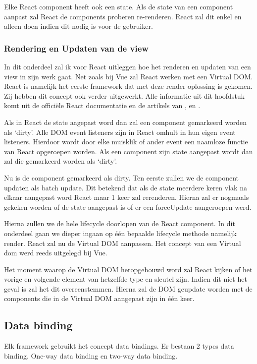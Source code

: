 
Elke React component heeft ook een state. Als de state van een component aanpast zal React de components proberen re-renderen. React zal dit enkel en alleen doen indien dit nodig is voor de gebruiker.

\subsubsection{Rendering en Updaten van de view}
\label{sec:React_Rendering_Updaten}
In dit onderdeel zal ik voor React uitleggen hoe het renderen en updaten van een view in zijn werk gaat. Net zoals bij Vue zal React werken met een Virtual DOM. React is namelijk het eerste framework dat met deze render oplossing is gekomen. Zij hebben dit concept ook verder uitgewerkt. Alle informatie uit dit hoofdstuk komt uit de officiële React documentatie \autocite{_react_2018} en de artikels van \textcite{mishra_hackernoon_2017} , \textcite{kurian_medium_2017} en \textcite{bain_lucybain_2017}.

Als in React de state aagepast word dan zal een component gemarkeerd worden als ‘dirty’. Alle DOM event listeners zijn in React omhult in hun eigen event listeners. Hierdoor wordt door elke muisklik of ander event een naamloze functie van React opgeroepen worden. Als een component zijn state aangepast wordt dan zal die gemarkeerd worden als ‘dirty’.

Nu is de component gemarkeerd als dirty. Ten eerste zullen we de component updaten als batch update. Dit betekend dat als de state meerdere keren vlak na elkaar aangepast word React maar 1 keer zal rerenderen. Hierna zal er nogmaals gekeken worden of de state aangepast is of er een forceUpdate aangeroepen werd.

Hierna zullen we de hele lifecycle doorlopen van de React component. In dit onderdeel gaan we dieper ingaan op één bepaalde lifecycle methode namelijk render. React zal nu de Virtual DOM aanpassen. Het concept van een Virtual dom werd reeds uitgelegd bij Vue.

Het moment waarop de Virtual DOM heropgebouwd word zal React kijken of het vorige en volgende element van hetzelfde type en sleutel zijn. Indien dit niet het geval is zal het dit overeenstemmen. Hierna zal de DOM geupdate worden met de components die in de Virtual DOM aangepast zijn in één keer.

\subsection{Data binding}
\label{sec:Data_Binding}
Elk framework gebruikt het concept data bindings. Er bestaan 2 types data binding. One-way data binding en two-way data binding.

